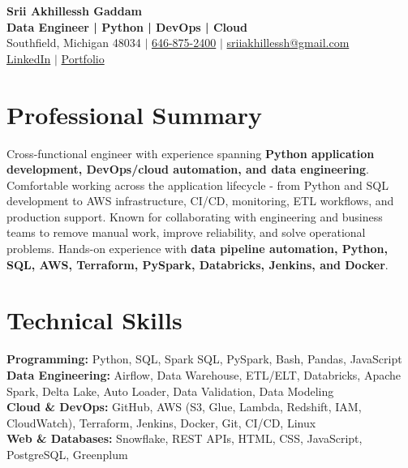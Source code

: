 \documentclass[letterpaper,10pt]{article}
\begin{document}
\fontsize{9.35pt}{10.45pt}\selectfont

\begin{center}
    {\LARGE \textbf{Srii Akhillessh Gaddam}} \\[-1pt]
    \textbf{Data Engineer | Python | DevOps | Cloud} \\[2pt]
    Southfield, Michigan 48034 $|$
    \href{tel:6468752400}{646-875-2400} $|$
    \href{mailto:sriiakhillessh@gmail.com}{sriiakhillessh@gmail.com} \\[1pt]
    \href{https://www.linkedin.com/in/srii-akhiilessh-gaddam-b48668191/}{LinkedIn} $|$
    \href{https://sriiakhillesshg.github.io/portfolio/}{Portfolio}
\end{center}
\vspace{-8pt}

\section{Professional Summary}
\small{Cross-functional engineer with experience spanning \textbf{Python application development, DevOps/cloud automation, and data engineering}. Comfortable working across the application lifecycle - from Python and SQL development to AWS infrastructure, CI/CD, monitoring, ETL workflows, and production support. Known for collaborating with engineering and business teams to remove manual work, improve reliability, and solve operational problems. Hands-on experience with \textbf{data pipeline automation, Python, SQL, AWS, Terraform, PySpark, Databricks, Jenkins, and Docker}.}

\section{Technical Skills}
\small{
\textbf{Programming:} Python, SQL, Spark SQL, PySpark, Bash, Pandas, JavaScript \\
\textbf{Data Engineering:} Airflow, Data Warehouse, ETL/ELT, Databricks, Apache Spark, Delta Lake, Auto Loader, Data Validation, Data Modeling \\
\textbf{Cloud \& DevOps:} GitHub, AWS (S3, Glue, Lambda, Redshift, IAM, CloudWatch), Terraform, Jenkins, Docker, Git, CI/CD, Linux \\
\textbf{Web \& Databases:} Snowflake, REST APIs, HTML, CSS, JavaScript, PostgreSQL, Greenplum
}
\end{document}
